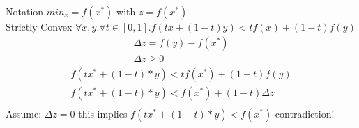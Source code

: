 Notation  $min_x = f(x^*) $ with $z = f(x^*)$ \\
Strictly Convex $\forall x,y. \forall t\in [0,1]. f(tx+(1-t)y) < tf(x) +(1-t)f(y)$ \\
\begin{align*}
\Delta z =  f(y) - f(x^*)\\
\Delta z \ge 0 
\end{align*} 
\begin{align*}
f(tx^*+(1-t)*y) < t f(x^*) + (1-t) f(y) \\
f(tx^*+(1-t)*y) < f(x^*) +(1-t)\Delta z \\
\end{align*}
Assume: $\Delta z = 0$ this implies $f(tx^*+(1-t)*y) < f(x^*)$ contradiction!

 

 